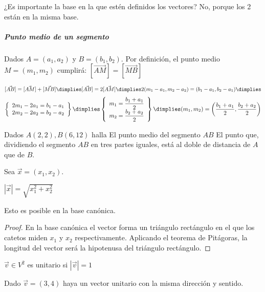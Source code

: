 \obs ¿Es importante la base en la que estén definidos los vectores? No, porque los 2 están en la misma base.

\subparagraph{Punto medio de un segmento} Dados $A=(a_1,a_2)$ y $B=(b_1,b_2)$. Por definición, el punto medio $M=(m_1,m_2)$ cumplirá: $[\vec{AM}] = [\vec{MB}]$

\[
[\vec{AB}] = [\vec{AM}] + [\vec{MB}]\dimplies
[\vec{AB}] = 2[\vec{AM}] \dimplies 
2(m_1-a_1,m_2-a_2) = (b_1-a_1,b_2-a_1) \dimplies
\]
\[
\left\{
	\begin{array}{c}
	2m_1-2a_1 = b_1-a_1\\
	2m_2-2a_2 = b_2-a_2
	\end{array}
\right\}\dimplies
\left\{
	\begin{array}{c}
	m_1 = \displaystyle\frac{b_1+a_1}{2}\\
	m_2 = \displaystyle\frac{b_2+a_2}{2}
	\end{array}
\right\}
\dimplies (m_1,m_2) = \left(\frac{b_1+a_1}{2},\frac{b_2+a_2}{2}\right)
\]

\begin{problem}
Dados $A(2,2), B(6,12)$ halla
\ppart El punto medio del segmento $AB$
\ppart El punto que, dividiendo el segmento $AB$ en tres partes iguales, está al doble de distancia de $A$  que de $B$.
\solution
\newpage
\end{problem}

\begin{prop} 
Sea $\vec{x} = (x_1,x_2)$.

$|\vec{x}| = \sqrt{x_1^2+x_2^2}$

\obs Esto es posible en la base canónica.
\end{prop}
\begin{proof}
En la base canónica el vector forma un triángulo rectángulo en el que los catetos miden $x_1$ y $x_2$ respectivamente. Aplicando el teorema de Pitágoras, la longitud del vector será la hipotenusa del triángulo rectángulo.
\end{proof}


\begin{defn} $\vec{v}\in V^2$ es unitario si $|\vec{v}|=1$
\end{defn}

\begin{problem}
Dado $\vec{v}=(3,4)$ haya un vector unitario con la misma dirección y sentido.
\solution

\end{problem}

